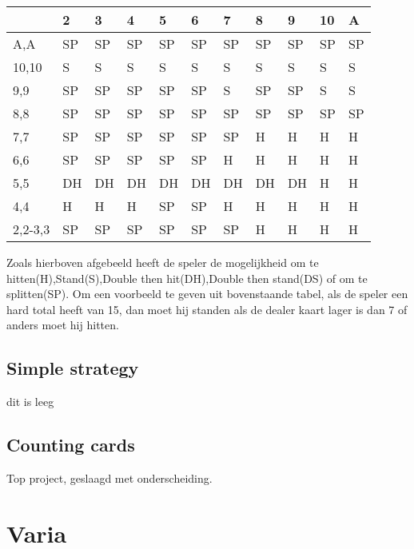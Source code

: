 \documentclass[conference]{IEEEtran}
\begin{document}
\begin{tabular}{|l|l|l|l|l|l|l|l|l|l|l|}
                             & 2  & 3  & 4  & 5  & 6  & 7  & 8  & 9  & 10 & A  \\ \hline
A,A                          & SP & SP & SP & SP & SP & SP & SP & SP & SP & SP \\ \hline
10,10                        & S  & S  & S  & S  & S  & S  & S  & S  & S  & S  \\ \hline
9,9                          & SP & SP & SP & SP & SP & S  & SP & SP & S  & S  \\ \hline
8,8                          & SP & SP & SP & SP & SP & SP & SP & SP & SP & SP \\ \hline
7,7                          & SP & SP & SP & SP & SP & SP & H  & H  & H  & H  \\ \hline
6,6                          & SP & SP & SP & SP & SP & H  & H  & H  & H  & H  \\ \hline
5,5                          & DH & DH & DH & DH & DH & DH & DH & DH & H  & H  \\ \hline
4,4                          & H  & H  & H  & SP & SP & H  & H  & H  & H  & H  \\ \hline
2,2-3,3                      & SP & SP & SP & SP & SP & SP & H  & H  & H  & H  \\ \hline
\end{tabular}


Zoals hierboven afgebeeld heeft de speler de mogelijkheid om te hitten(H),Stand(S),Double then hit(DH),Double then stand(DS) of om te splitten(SP). Om een voorbeeld te geven uit bovenstaande tabel, als de speler een hard total heeft van 15, dan moet hij standen als de dealer kaart lager is dan 7 of anders moet hij hitten.





\subsection{Simple strategy}
dit is leeg
\subsection{Counting cards}
Top project, geslaagd met onderscheiding.

\section*{Varia}




\end{document}

